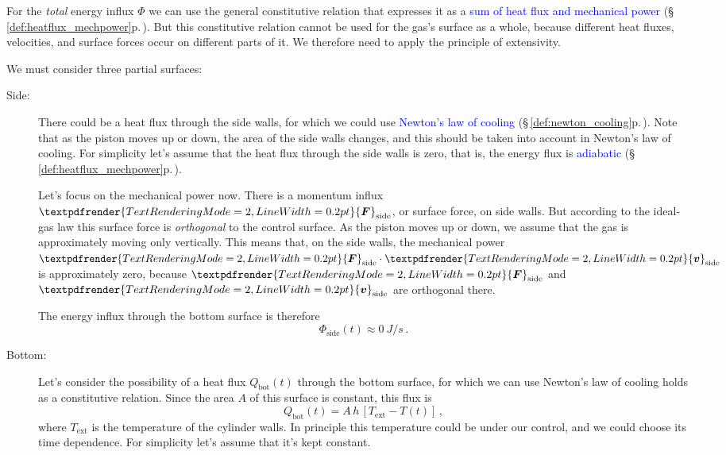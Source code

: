 \documentclass[a4paper,12pt,%
onecolumn,oneside,%
british%
]{memoir}
\renewcommand*{\bm}[1]{\textpdfrender{TextRenderingMode=2,LineWidth=0.2pt}{\boldsymbol{#1}}}
\renewcommand*{\|}[1][]{\nonscript\:#1\vert\nonscript\:\mathopen{}}
\newcommand*{\sect}{\S}%
\renewcommand*{\autoref}[3][\sect\,\ref]{\textcolor{blue}{#3} {\color{blue}\scriptsize(\faIcon[regular]{eye}\;#1{#2}\;p.\,\pageref{#2})}}
\newcommand*{\yhea}{h} %
\newcommand*{\yv}{\bm{v}}
\newcommand*{\yH}{\varPhi}%
\newcommand*{\yQ}{Q}%
\newcommand*{\yF}{\bm{F}}
\newcommand*{\yT}{T}%
\newcommand*{\yTe}{\yT_{\text{ext}}}%
\begin{document}
\medskip

For the \emph{total} energy influx $\yH$ we can use the general constitutive relation that expresses it as a \autoref{def:heatflux_mechpower}{sum of heat flux and mechanical power}. But this constitutive relation cannot be used for the gas's surface as a whole, because different heat fluxes, velocities, and surface forces occur on different parts of it. We therefore need to apply the principle of extensivity.

We must consider three partial surfaces:
\begin{description}
\item[Side:] There could be a heat flux through the side walls, for which we could use \autoref{def:newton_cooling}{Newton's law of cooling}. Note that as the piston moves up or down, the area of the side walls changes, and this should be taken into account in Newton's law of cooling. For simplicity let's assume that the heat flux through the side walls is zero, that is, the energy flux is \autoref{def:heatflux_mechpower}{adiabatic}.

  Let's focus on the mechanical power now. There is a momentum influx $\yF_{\text{side}}$, or surface force, on side walls. But according to the ideal-gas law this surface force is \emph{orthogonal} to the control surface. As the piston moves up or down, we assume that the gas is approximately moving only vertically. This means that, on the side walls, the mechanical power $\yF_{\text{side}}\cdot\yv_{\text{side}}$ is approximately zero, because $\yF_{\text{side}}$ and $\yv_{\text{side}}$ are orthogonal there.

    The energy influx through the bottom surface is therefore
  \begin{equation*}
    \yH_{\text{side}}(t) \approx \qty{0}{J/s} \,.
  \end{equation*}
  
\item[Bottom:] Let's consider the possibility of a heat flux $\yQ_{\textrm{bot}}(t)$ through the bottom surface, for which we can use Newton's law of cooling holds as a constitutive relation. Since the area $A$ of this surface is constant, this flux is
  \begin{equation*}
    \yQ_{\textrm{bot}}(t) = A\,\yhea\,[\yTe-\yT(t)] \,,
  \end{equation*}
  where $\yTe$ is the temperature of the cylinder walls. In principle this temperature could be under our control, and we could choose its time dependence. For simplicity let's assume that it's kept constant.


\end{description}
\end{document}
